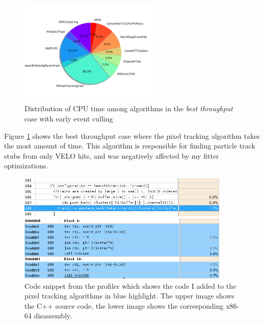 \documentclass[12pt]{article}
\begin{document}
\begin{figure}[H]
	\begin{center}
		\includegraphics[width=0.6\textwidth]{algo_usage_original_bestthru}
	\end{center}
	\caption{Distribution of CPU time among algorithms in the \textit{best throughput} case with early event culling}
	\label{fig_algo_usage_original_bestthru}
\end{figure}

Figure \ref{fig_algo_usage_original_bestthru} shows the best throughput case where the pixel tracking algorithm takes the most amount of time. This algorithm is responsible for finding particle track stubs from only VELO hits, and was negatively affected by my fitter optimizations.

\begin{figure}[H]
	\begin{center}
		\includegraphics[width=0.9\textwidth]{kalmanfit_disasm_opt_src_naive}
	\end{center}
	\begin{center}
		\includegraphics[width=0.9\textwidth]{kalmanfit_disasm_opt_asm_naive}
	\end{center}
	\caption{Code snippet from the profiler which shows the code I added to the pixel tracking algorithms in blue highlight. The upper image shows the C++ source code, the lower image shows the corresponding x86-64 disassembly.}
	\label{fig_kalman_disasm_src_naive}
\end{figure}
\end{document}

